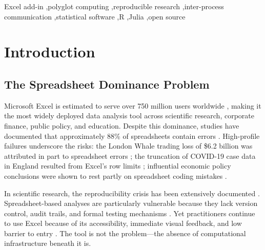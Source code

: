 \documentclass[preprint,12pt,authoryear]{elsarticle}
\newcommand{\neven}{NE\raisebox{0.2ex}{v}\rotatebox[origin=c]{180}{E}\rotatebox[origin=c]{180}{N}}
\begin{document}
\begin{frontmatter}
\begin{abstract}
Statistical outputs have been validated against the established econometric benchmarks of \citet{Wooldridge2016}, confirming numerical correctness across regression, panel data, and time-series implementations. The system is released under the GNU General Public License v3, \textbf{enabling} community-driven expansion through shared functions in any supported language.

\end{abstract}

\begin{keyword}
	\footnotesize
Excel add-in \sep polyglot computing \sep reproducible research \sep inter-process communication \sep statistical software \sep R \sep Julia \sep open source
\end{keyword}

\end{frontmatter}



\section{Introduction}
\label{sec:introduction}

\subsection{The Spreadsheet Dominance Problem}

Microsoft Excel is estimated to serve over 750 million users worldwide \citep{Microsoft2023}, making it the most widely deployed data analysis tool across scientific research, corporate finance, public policy, and education. Despite this dominance, studies have documented that approximately 88\% of spreadsheets contain errors \citep{Panko2016}. High-profile failures underscore the risks: the London Whale trading loss of \$6.2 billion was attributed in part to spreadsheet errors \citep{JPMorgan2013}; the truncation of COVID-19 case data in England resulted from Excel's row limits \citep{Kelion2020}; influential economic policy conclusions were shown to rest partly on spreadsheet coding mistakes \citep{Herndon2014}.

In scientific research, the reproducibility crisis has been extensively documented \citep{Baker2016, Ioannidis2005}. Spreadsheet-based analyses are particularly vulnerable because they lack version control, audit trails, and formal testing mechanisms \citep{Peng2011}. Yet practitioners continue to use Excel because of its accessibility, immediate visual feedback, and low barrier to entry \citep{Scaffidi2005}. The tool is not the problem---the absence of computational infrastructure beneath it is.
\end{document}
